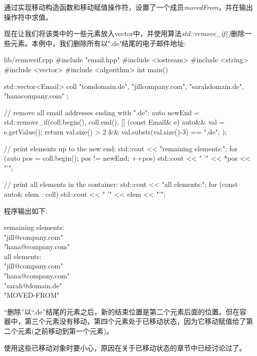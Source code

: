 通过实现移动构造函数和移动赋值操作符，设置了一个成员\textit{movedFrom}，并在输出操作符中求值。\par

现在让我们将该类中的一些元素放入vector中，并使用算法\textit{std::\allowbreak{}remove\_\allowbreak{}if(\allowbreak{})\allowbreak{}}删除一些元素。本例中，我们删除所有以".de"结尾的电子邮件地址:\par

\begin{codeboxt}[cpp]{lib/removeif.cpp}
#include "email.hpp"
#include <iostream>
#include <string>
#include <vector>
#include <algorithm>
int main()
{
  std::vector<Email> coll{ "tomdomain.de", "jillcompany.com",
    "sarahdomain.de", "hanacompany.com" };

  // remove all email addresses ending with ".de":
  auto newEnd = std::remove_if(coll.begin(), coll.end(),
  [] (const Email& e) {
    auto&& val = e.getValue();
    return val.size() > 2 &&
    val.substr(val.size()-3) == ".de";
  });

  // print elements up to the new end:
  std::cout << "remaining elements:\n";
  for (auto pos = coll.begin(); pos != newEnd; ++pos) {
    std::cout << " '" << *pos << "'\n";
  }

  // print all elements in the container:
  std::cout << "all elements:\n";
  for (const auto& elem : coll) {
    std::cout << " '" << elem << "'\n";
  }
}
\end{codeboxt}

程序输出如下:\par

\begin{myOutput}
remaining elements: \\
"jill@company.com" \\
"hana@company.com" \\
all elements: \\
"jill@company.com" \\
"hana@company.com" \\
"sarah@domain.de" \\
"MOVED-FROM"
\end{myOutput}

“删除”以“.de”结尾的元素之后，新的结束位置是第二个元素后面的位置。但在容器中，第三个元素没有移动，第四个元素处于已移动状态，因为它移动赋值给了第二个元素(之前移动到第一个元素)。\par

使用这些已移动对象时要小心，原因在关于已移动状态的章节中已经讨论过了。\par

